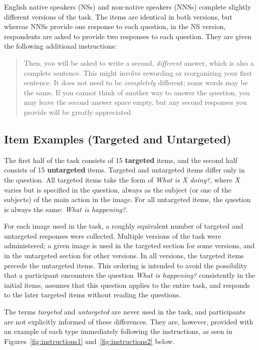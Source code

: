 \documentclass[12pt,notitlepage]{article}
\begin{document}
English native speakers (NSs) and non-native speakers (NNSs) complete slightly different versions of the task. The items are identical in both versions, but whereas NNSs provide one response to each question, in the NS version, respondents are asked to provide two responses to each question. They are given the following additional instructions:

\begin{quotation}\noindent
Then, you will be asked to write a second, \textit{different} answer, which is also a complete sentence. This might involve rewording or reorganizing your first sentence. It does not need to be \textit{completely} different; some words may be the same. If you cannot think of another way to answer the question, you may leave the second answer space empty, but any second responses you provide will be greatly appreciated.
\end{quotation}

\subsection{Item Examples (Targeted and Untargeted)}

The first half of the task consists of 15 \textbf{targeted} items, and the second half consists of 15 \textbf{untargeted} items. Targeted and untargeted items differ only in the question. All targeted items take the form of \textit{What is X doing?}, where \textit{X} varies but is specified in the question, always as the subject (or one of the subjects) of the main action in the image. For all untargeted items, the question is always the same: \textit{What is happening?}.

For each image used in the task, a roughly equivalent number of targeted and untargeted responses were collected. Multiple versions of the task were administered; a given image is used in the targeted section for some versions, and in the untargeted section for other versions. In all versions, the targeted items precede the untargeted items. This ordering is intended to avoid the possibility that a participant encounters the question \textit{What is happening?} consistently in the initial items, assumes that this question applies to the entire task, and responds to the later targeted items without reading the questions.

The terms \textit{targeted} and \textit{untargeted} are never used in the task, and participants are not explicitly informed of these differences. They are, however, provided with an example of each type immediately following the instructions, as seen in Figures~\ref{fig:instructions1} and~\ref{fig:instructions2} below.
\end{document}

